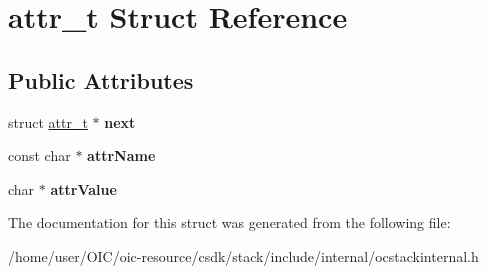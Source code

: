 \hypertarget{structattr__t}{}\section{attr\+\_\+t Struct Reference}
\label{structattr__t}
\subsection*{Public Attributes}
\begin{DoxyCompactItemize}
\item 
\hypertarget{structattr__t_abc6eb3f9fe173f4f6c121f4e48f0fda7}{}struct \hyperlink{structattr__t}{attr\+\_\+t} $\ast$ {\bfseries next}\label{structattr__t_abc6eb3f9fe173f4f6c121f4e48f0fda7}

\item 
\hypertarget{structattr__t_ae5d8e0afdd592943f28ff016e7a5d84a}{}const char $\ast$ {\bfseries attr\+Name}\label{structattr__t_ae5d8e0afdd592943f28ff016e7a5d84a}

\item 
\hypertarget{structattr__t_ad5fbfd7c9d3790f6a0a0ac7c2ccb91ab}{}char $\ast$ {\bfseries attr\+Value}\label{structattr__t_ad5fbfd7c9d3790f6a0a0ac7c2ccb91ab}

\end{DoxyCompactItemize}


The documentation for this struct was generated from the following file\+:\begin{DoxyCompactItemize}
\item 
/home/user/\+O\+I\+C/oic-\/resource/csdk/stack/include/internal/ocstackinternal.\+h\end{DoxyCompactItemize}
